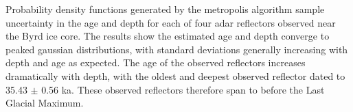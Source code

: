 
Probability density functions generated by the metropolis algorithm sample uncertainty in the age and depth for each of four adar reflectors observed near the Byrd ice core. The results show the estimated age and depth converge to peaked gaussian distributions, with standard deviations generally increasing with depth and age as expected. The age of the observed reflectors increases dramatically with depth, with the oldest and deepest observed reflector dated to 35.43 $\pm$ 0.56 ka. These observed reflectors therefore span to before the Last Glacial Maximum.

